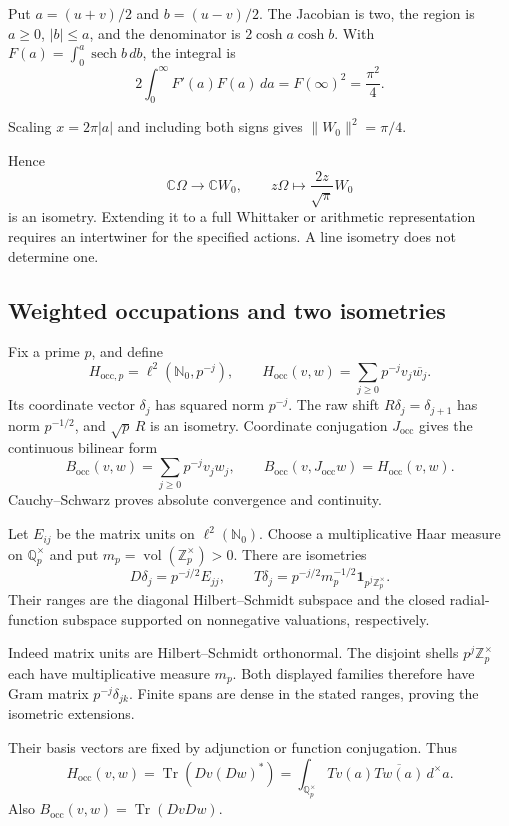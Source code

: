 Put $a=(u+v)/2$ and $b=(u-v)/2$. The Jacobian is two, the region is
$a\geq0$, $|b|\leq a$, and the denominator is $2\cosh a\cosh b$. With
$F(a)=\int_0^a\operatorname{sech}b\,db$, the integral is
\[
 2\int_0^\infty F'(a)F(a)\,da
   =F(\infty)^2=\frac{\pi^2}{4}.
\]

Scaling $x=2\pi|a|$ and including both signs gives $\|W_0\|^2=\pi/4$.

Hence
\[
 \mathbb C\Omega\longrightarrow\mathbb C W_0,\qquad
 z\Omega\longmapsto\frac{2z}{\sqrt\pi}W_0
\]
is an isometry. Extending it to a full Whittaker or arithmetic
representation requires an intertwiner for the specified actions. A line
isometry does not determine one.

\subsection{Weighted occupations and two isometries}

Fix a prime $p$, and define
\[
 H_{\mathrm{occ},p}=\ell^2(\mathbb N_0,p^{-j}),\qquad
 H_{\mathrm{occ}}(v,w)=\sum_{j\geq0}p^{-j}v_j\overline{w_j}.
\]
Its coordinate vector $\delta_j$ has squared norm $p^{-j}$. The raw shift
$R\delta_j=\delta_{j+1}$ has norm $p^{-1/2}$, and $\sqrt p\,R$ is an
isometry. Coordinate conjugation $J_{\mathrm{occ}}$ gives the continuous
bilinear form
\[
 B_{\mathrm{occ}}(v,w)=\sum_{j\geq0}p^{-j}v_jw_j,\qquad
 B_{\mathrm{occ}}(v,J_{\mathrm{occ}}w)=H_{\mathrm{occ}}(v,w).
\]
Cauchy--Schwarz proves absolute convergence and continuity.

Let $E_{ij}$ be the matrix units on $\ell^2(\mathbb N_0)$. Choose a
multiplicative Haar measure on $\mathbb Q_p^\times$ and put
$m_p=\operatorname{vol}(\mathbb Z_p^\times)>0$. There are isometries
\begin{equation}
\label{v4-arith:traces:local-isometries}
 D\delta_j=p^{-j/2}E_{jj},\qquad
 T\delta_j=p^{-j/2}m_p^{-1/2}\mathbf1_{p^j\mathbb Z_p^\times}.
\end{equation}
Their ranges are the diagonal Hilbert--Schmidt subspace and the closed
radial-function subspace supported on nonnegative valuations, respectively.

Indeed matrix units are Hilbert--Schmidt orthonormal. The disjoint shells
$p^j\mathbb Z_p^\times$ each have multiplicative measure $m_p$. Both
displayed families therefore have Gram matrix $p^{-j}\delta_{jk}$. Finite
spans are dense in the stated ranges, proving the isometric extensions.

Their basis vectors are fixed by adjunction or function conjugation. Thus
\[
 H_{\mathrm{occ}}(v,w)
  =\operatorname{Tr}(Dv(Dw)^*)
  =\int_{\mathbb Q_p^\times}Tv(a)\overline{Tw(a)}\,d^\times a.
\]
Also $B_{\mathrm{occ}}(v,w)=\operatorname{Tr}(DvDw)$.

